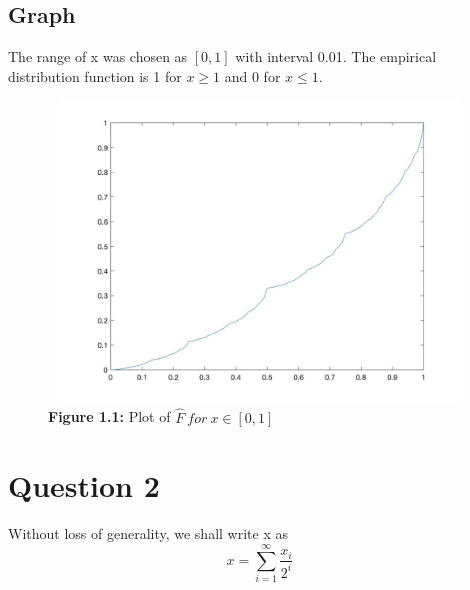 \documentclass[11pt]{article}
\begin{document}
\subsection*{Graph}
The range of x was chosen as $\left[0,1\right]$
with interval 0.01. The empirical distribution function is 1 for $x\geq1$ and 0 for $x\leq1$.
\begin{figure}
\includegraphics[width=13cm,height=8cm]{Q1}
\caption{\textbf{Figure 1.1:} Plot of $\hat{F} \ for\ x\in\left[0,1\right]$}
\end{figure}
\pagebreak
%
%

\pagebreak
\section*{Question 2}
Without loss of generality, we shall write x as  
\begin{equation*}
x=\sum_{i=1}^{\infty}\frac{x_{i}}{2^{i}}
\end{equation*}
\end{document}
